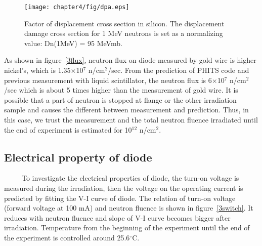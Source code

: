 \begin{figure}[H]
 \centering
 \texttt{[image: chapter4/fig/dpa.eps]}
 \caption{Factor of displacement cross section in silicon. The displacement damage cross section for 1 MeV neutrons is set as a normalizing value: Dn(1MeV) = 95 MeVmb.}
 \label{dpafactor}
\end{figure}
As shown in figure~\ref{3flux}, neutron flux on diode measured by gold wire is higher nickel's, which is 1.35$\times$10$^7$ n/cm$^2$/sec.
From the prediction of PHITS code and previous measurement with liquid scintillator, the neutron flux is 6$\times$10$^7$ n/cm$^2$/sec which is about 5 times higher than the measurement of gold wire.
It is possible that a part of neutron is stopped at flange or the other irradiation sample and causes the different between measurement and prediction.
Thus, in this case, we trust the measurement and the total neutron fluence irradiated until the end of experiment is estimated for 10$^{12}$ n/cm$^2$.

  \subsection{Electrical property of diode}
~~~~~To investigate the electrical properties of diode, the turn-on voltage is measured during the irradiation, then the voltage on the operating current is predicted by fitting the V-I curve of diode.
The relation of turn-on voltage (forward voltage at 100 mA) and neutron fluence is shown in figure~\ref{3switch}.
It reduces with neutron fluence and slope of V-I curve becomes bigger after irradiation.
Temperature from the beginning of the experiment until the end of the experiment is controlled around 25.6$^{\circ}$C.

